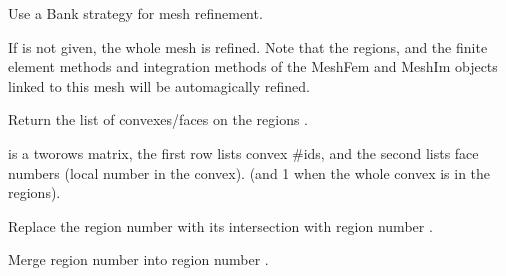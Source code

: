 \documentclass[a4paper,11pt,english]{sphinxmanual}
\begin{document}
\begin{fulllineitems}

\begin{fulllineitems}
\label{\detokenize{python/cmdref_Mesh:getfem.Mesh.refine}}
Use a Bank strategy for mesh refinement.

If  is not given, the whole mesh is refined. Note
that the regions, and the finite element methods and
integration methods of the MeshFem and MeshIm objects linked
to this mesh will be automagically refined.

\end{fulllineitems}


\begin{fulllineitems}
\label{\detokenize{python/cmdref_Mesh:getfem.Mesh.region}}
Return the list of convexes/faces on the regions .

 is a two\sphinxhyphen{}rows matrix, the first row lists convex \#ids,
and the second lists face numbers (local number in the convex).
(and \sphinxhyphen{}1 when the whole convex is in the
regions).

\end{fulllineitems}


\begin{fulllineitems}
\label{\detokenize{python/cmdref_Mesh:getfem.Mesh.region_intersect}}
Replace the region number  with its intersection with region number .

\end{fulllineitems}


\begin{fulllineitems}
\label{\detokenize{python/cmdref_Mesh:getfem.Mesh.region_merge}}
Merge region number  into region number .


\end{fulllineitems}
\end{fulllineitems}
\end{document}

